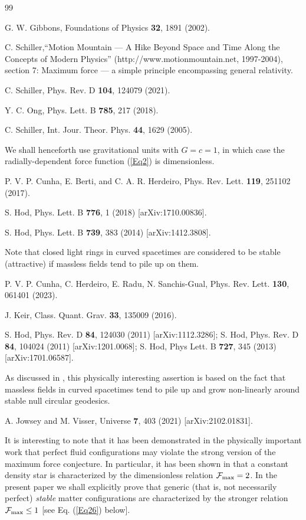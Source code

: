 \documentclass[preprintnumbers,amsmath,amssymbm,prd]{revtex4}
\begin{document}
\begin{thebibliography}{99}

 G. W. Gibbons, Foundations of Physics {\bf 32}, 1891 (2002).

 C. Schiller,``Motion Mountain — A Hike Beyond Space and Time Along the Concepts
of Modern Physics” (http://www.motionmountain.net, 1997-2004), 
section 7: Maximum force — a simple principle encompassing general relativity.

 C. Schiller, Phys. Rev. D {\bf 104}, 124079 (2021). 

 Y. C. Ong, Phys. Lett. B {\bf 785}, 217 (2018).

 C. Schiller, Int. Jour. Theor. Phys. {\bf 44}, 1629 (2005).

 We shall henceforth use gravitational units with $G=c=1$, 
in which case the radially-dependent force function (\ref{Eq2}) is dimensionless. 

 P. V. P. Cunha, E. Berti, and C. A. R. Herdeiro, Phys. Rev. Lett. {\bf 119}, 251102 (2017).

 S. Hod, Phys. Lett. B {\bf 776}, 1 (2018) [arXiv:1710.00836].

 S. Hod, Phys. Lett. B {\bf 739}, 383 (2014) [arXiv:1412.3808].

 Note that closed light rings in curved spacetimes are considered to be
stable (attractive) if massless fields tend to pile up on them.

 P. V. P. Cunha, C. Herdeiro, E. Radu, N. Sanchis-Gual, Phys. Rev. Lett. {\bf 130}, 061401 (2023).

 J. Keir, Class. Quant. Grav. {\bf 33}, 135009 (2016).

 S. Hod, Phys. Rev. D {\bf 84}, 124030 (2011)
[arXiv:1112.3286]; S. Hod, Phys. Rev. D {\bf 84}, 104024 (2011)
[arXiv:1201.0068]; S. Hod, Phys Lett. B {\bf 727}, 345 (2013)
[arXiv:1701.06587].

 As discussed in \cite{Keir,HerNew}, 
this physically interesting assertion is based on the fact that massless fields in curved spacetimes tend to pile up
and grow non-linearly around stable null circular geodesics.

 A. Jowsey and M. Visser, Universe {\bf 7}, 403 (2021) [arXiv:2102.01831]. 

 It is interesting to note that it has been demonstrated in 
the physically important work \cite{JoVi} 
that perfect fluid configurations may violate the strong version of the maximum force conjecture. 
In particular, it has been shown in \cite{JoVi} that a constant density star is characterized 
by the dimensionless relation ${\cal F}_{\text{max}}=2$. In the present paper we shall explicitly prove that generic (that 
is, not necessarily perfect) {\it stable} matter configurations are characterized by the stronger 
relation ${\cal F}_{\text{max}}\leq1$ [see Eq. (\ref{Eq26}) below]. 


\end{thebibliography}
\end{document}
